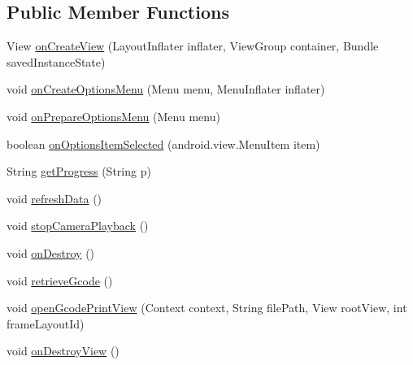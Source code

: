 \subsection*{Public Member Functions}
\begin{DoxyCompactItemize}
\item 
View \hyperlink{classandroid_1_1app_1_1printerapp_1_1devices_1_1printview_1_1_print_view_fragment_a3efccd10b4a04921fe1558c1a31c86a1}{on\+Create\+View} (Layout\+Inflater inflater, View\+Group container, Bundle saved\+Instance\+State)
\item 
void \hyperlink{classandroid_1_1app_1_1printerapp_1_1devices_1_1printview_1_1_print_view_fragment_adab6f74bfdc01ffc25435e7f3ab3bbca}{on\+Create\+Options\+Menu} (Menu menu, Menu\+Inflater inflater)
\item 
void \hyperlink{classandroid_1_1app_1_1printerapp_1_1devices_1_1printview_1_1_print_view_fragment_a9f2d0b167ce1e4668dc0fee26c8d7487}{on\+Prepare\+Options\+Menu} (Menu menu)
\item 
boolean \hyperlink{classandroid_1_1app_1_1printerapp_1_1devices_1_1printview_1_1_print_view_fragment_ad2e78ce77aa41186c34cad5563a44280}{on\+Options\+Item\+Selected} (android.\+view.\+Menu\+Item item)
\item 
String \hyperlink{classandroid_1_1app_1_1printerapp_1_1devices_1_1printview_1_1_print_view_fragment_aeaefd9e121eb0883ebf976347de91218}{get\+Progress} (String p)
\item 
void \hyperlink{classandroid_1_1app_1_1printerapp_1_1devices_1_1printview_1_1_print_view_fragment_a61cd66f9511ddb15883b7c72423bcba8}{refresh\+Data} ()
\item 
void \hyperlink{classandroid_1_1app_1_1printerapp_1_1devices_1_1printview_1_1_print_view_fragment_a4144298d7c33d915b70392aef0870717}{stop\+Camera\+Playback} ()
\item 
void \hyperlink{classandroid_1_1app_1_1printerapp_1_1devices_1_1printview_1_1_print_view_fragment_a7599545be947b08622ee1aedf2e9752b}{on\+Destroy} ()
\item 
void \hyperlink{classandroid_1_1app_1_1printerapp_1_1devices_1_1printview_1_1_print_view_fragment_a8c460d8b10a2bf3d12ca29b3489a5fbb}{retrieve\+Gcode} ()
\item 
void \hyperlink{classandroid_1_1app_1_1printerapp_1_1devices_1_1printview_1_1_print_view_fragment_a1112855d641af9db65fe654ec2a46423}{open\+Gcode\+Print\+View} (Context context, String file\+Path, View root\+View, int frame\+Layout\+Id)
\item 
void \hyperlink{classandroid_1_1app_1_1printerapp_1_1devices_1_1printview_1_1_print_view_fragment_a34ad2b7695cf52335e803d4e2a22202b}{on\+Destroy\+View} ()
\end{DoxyCompactItemize}
